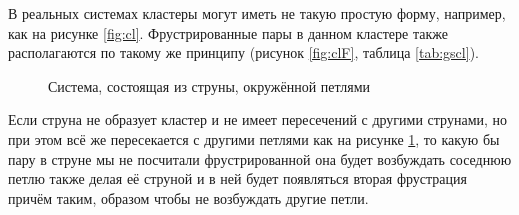 \documentclass[utf8, babel, sor, jor, amsmath,amssymb, reprint]{elsarticle} %
\begin{document}
В реальных системах кластеры могут иметь не такую простую форму, например, как на рисунке \ref{fig:cl}. Фрустрированные пары в данном кластере также располагаются по такому же принципу (рисунок \ref{fig:clF}, таблица \ref{tab:gscl}).


\begin{figure}[h]
	\centering
	\caption{Система, состоящая из струны, окружённой петлями}
	\label{fig:4x4}
\end{figure}

Если струна не образует кластер и не имеет пересечений с другими струнами, но при этом всё же пересекается с другими петлями как на рисунке \ref{fig:4x4}, то какую бы пару в струне мы не посчитали фрустрированной она будет возбуждать соседнюю петлю также делая её струной и в ней будет появляться вторая фрустрация причём таким, образом чтобы не возбуждать другие петли. 
\end{document}
